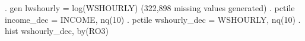 . gen lwshourly = log(WSHOURLY)
(322,898 missing values generated)
{\smallskip}
. pctile income_dec = INCOME, nq(10)
{\smallskip}
. pctile wshourly_dec = WSHOURLY, nq(10)
{\smallskip}
. hist wshourly_dec, by(RO3)
{\smallskip}
